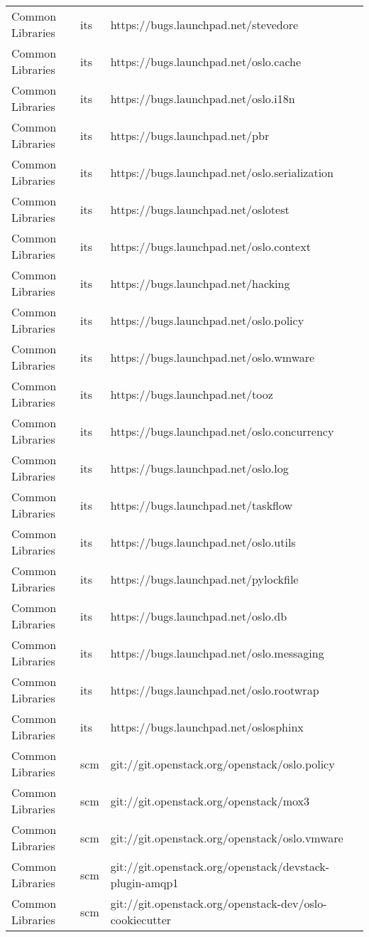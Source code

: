 \begin{center}
\begin{longtable}{|p{4cm}|p{1cm}|p{10cm}|}
Common Libraries&its&https://bugs.launchpad.net/stevedore\\ 
Common Libraries&its&https://bugs.launchpad.net/oslo.cache\\ 
Common Libraries&its&https://bugs.launchpad.net/oslo.i18n\\ 
Common Libraries&its&https://bugs.launchpad.net/pbr\\ 
Common Libraries&its&https://bugs.launchpad.net/oslo.serialization\\ 
Common Libraries&its&https://bugs.launchpad.net/oslotest\\ 
Common Libraries&its&https://bugs.launchpad.net/oslo.context\\ 
Common Libraries&its&https://bugs.launchpad.net/hacking\\ 
Common Libraries&its&https://bugs.launchpad.net/oslo.policy\\ 
Common Libraries&its&https://bugs.launchpad.net/oslo.wmware\\ 
Common Libraries&its&https://bugs.launchpad.net/tooz\\ 
Common Libraries&its&https://bugs.launchpad.net/oslo.concurrency\\ 
Common Libraries&its&https://bugs.launchpad.net/oslo.log\\ 
Common Libraries&its&https://bugs.launchpad.net/taskflow\\ 
Common Libraries&its&https://bugs.launchpad.net/oslo.utils\\ 
Common Libraries&its&https://bugs.launchpad.net/pylockfile\\ 
Common Libraries&its&https://bugs.launchpad.net/oslo.db\\ 
Common Libraries&its&https://bugs.launchpad.net/oslo.messaging\\ 
Common Libraries&its&https://bugs.launchpad.net/oslo.rootwrap\\ 
Common Libraries&its&https://bugs.launchpad.net/oslosphinx\\ 
Common Libraries&scm&git://git.openstack.org/openstack/oslo.policy\\ 
Common Libraries&scm&git://git.openstack.org/openstack/mox3\\ 
Common Libraries&scm&git://git.openstack.org/openstack/oslo.vmware\\ 
Common Libraries&scm&git://git.openstack.org/openstack/devstack-plugin-amqp1\\ 
Common Libraries&scm&git://git.openstack.org/openstack-dev/oslo-cookiecutter\\ 

\end{longtable}
\end{center}
